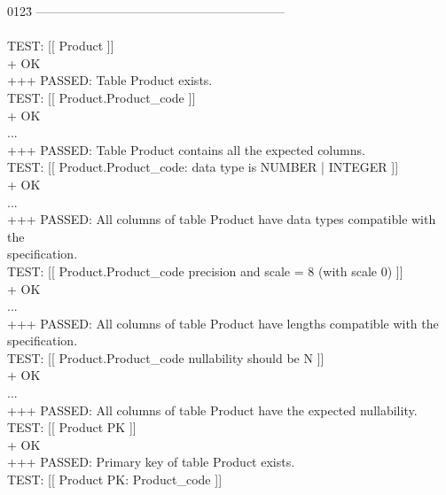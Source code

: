 \documentclass[sigconf, authordraft]{acmart}
\begin{document}
\begin{table}
    \ttfamily\scriptsize
    \begin{tabbing}
        0123\=\kill
        ------------------------------------------------------------ \\
         \\
        TEST: [[ Product ]]  \\
        \>  + OK \\
        +++ PASSED: Table Product exists. \\
        TEST: [[ Product.Product\_code ]]  \\
        \>  + OK \\
        ... \\
        +++ PASSED: Table Product contains all the expected columns. \\
        TEST: [[ Product.Product\_code: data type is NUMBER | INTEGER ]]  \\
        \>  + OK \\
        ... \\
        +++ PASSED: All columns of table Product have data types compatible with the\\
         specification. \\
        TEST: [[ Product.Product\_code precision and scale = 8 (with scale 0) ]]  \\
        \>  + OK \\
        ... \\
        +++ PASSED: All columns of table Product have lengths compatible with the \\
        specification. \\
        TEST: [[ Product.Product\_code nullability should be N ]]  \\
        \>  + OK \\
        ... \\
        +++ PASSED: All columns of table Product have the expected nullability. \\
        TEST: [[ Product PK ]]  \\
        \>  + OK \\
        +++ PASSED: Primary key of table Product exists. \\
        TEST: [[ Product PK: Product\_code ]]  \\

\end{tabbing}
\end{table}
\end{document}
